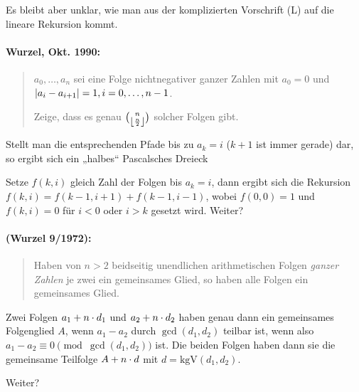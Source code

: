 \documentclass[11pt,a4paper]{article}
\begin{document}
Es bleibt aber unklar, wie man aus der komplizierten Vorschrift (L) auf die
lineare Rekursion kommt.  

\paragraph{Wurzel, Okt. 1990:}
\begin{quote}
  $a_0,\dots, a_n$ sei eine Folge nichtnegativer ganzer Zahlen mit $a_0=0$ und
  $\left\vert a_i-a_{i+1}\right\vert=1, i=0,\dots,n-1$.

  Zeige, dass es genau $\binom{n}{\left\lfloor \frac{n}{2}\right\rfloor}$ solcher Folgen gibt.
\end{quote}
\begin{loesung}
  Stellt man die entsprechenden Pfade bis zu $a_k=i$ ($k+1$ ist immer gerade)
  dar, so ergibt sich ein „halbes“ Pascalsches Dreieck
  
  Setze $f(k,i)$ gleich Zahl der Folgen bis $a_k=i$, dann ergibt sich die
  Rekursion $f(k,i)=f(k-1,i+1)+f(k-1,i-1)$, wobei $f(0,0)=1$ und $f(k,i)=0$
  für $i<0$ oder $i>k$ gesetzt wird. Weiter?  
\end{loesung}

\paragraph{(Wurzel 9/1972):} 
\begin{quote}
  Haben von $n>2$ beidseitig unendlichen arithmetischen Folgen \emph{ganzer
  Zahlen} je zwei ein gemeinsames Glied, so haben alle Folgen ein gemeinsames
  Glied.
\end{quote}
\begin{loesung}
  Zwei Folgen $a_1+n\cdot d_1$ und $a_2+n\cdot d_2$ haben genau dann ein gemeinsames
  Folgenglied $A$, wenn $a_1-a_2$ durch $\gcd(d_1,d_2)$ teilbar ist, wenn also
  $a_1-a_2\equiv 0\pmod{\gcd(d_1,d_2)}$ ist.  Die beiden Folgen haben dann sie
  die gemeinsame Teilfolge $A+n\cdot d$ mit $d=\mathrm{kgV}(d_1,d_2)$.

  Weiter?

\end{loesung}
\end{document}
